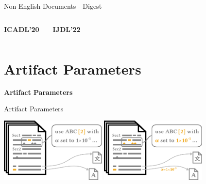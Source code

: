 \documentclass[en,16:9,smallfoot]{sdqbeamer}
\begin{document}
\begin{frame}{Non-English Documents - Digest}
\begin{columns}
           \begin{infobox-pub-small}
           \textbf{ICADL'20}~\cite{Saier2020xling}
           \end{infobox-pub-small}
           \vspace{-0.5em}
           \begin{infobox-pub-small}
           \textbf{IJDL'22}~\cite{Saier2021}
           \end{infobox-pub-small}
   \end{columns}
   \end{frame}

\section{Artifact Parameters}

   \begin{frame}[plain]
        \vspace{0.7cm}
        \begin{infobox-map}
        \centering
        \begin{Huge}
        \textbf{Artifact Parameters}\\
        \end{Huge}
        \end{infobox-map}
   \end{frame}

   \begin{frame}{Artifact Parameters}
       \begin{overprint}
            \centering\includegraphics[width=0.4\textwidth]{imgs/schema_add_09_vargapartf_1}
            \centering\includegraphics[width=0.4\textwidth]{imgs/schema_add_09_vargapartf_0}
       \end{overprint}
   \end{frame}
\end{document}
